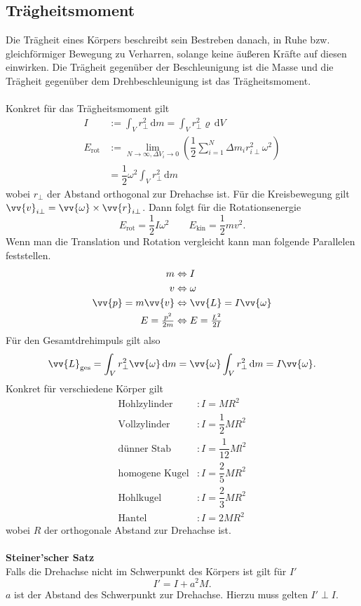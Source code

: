 \documentclass[a4paper,12pt]{article}
\newcommand{\td}{\,\text{d}}
\numberwithin{equation}{section}
\begin{document}
\subsection{Trägheitsmoment}
Die Trägheit eines Körpers beschreibt sein Bestreben danach, in Ruhe bzw. gleichförmiger Bewegung zu Verharren, solange keine äußeren Kräfte auf diesen einwirken. Die Trägheit gegenüber der Beschleunigung ist die Masse und die Trägheit gegenüber dem Drehbeschleunigung ist das Trägheitsmoment.\\\\
Konkret für das Trägheitsmoment gilt
\begin{align*}
        I&:=\int_{V}^{}r_{\perp}^2\td m=\int_{V}^{}r_{\perp}^2\varrho\td V\\
        E_{\text{rot}}&:=\lim_{N\rightarrow \infty,\Delta V_i\rightarrow 0}\left(\dfrac{1}{2}\sum_{i=1}^{N}\Delta m_ir_{i\perp}^2\omega ^2\right)\\
                      &=\dfrac{1}{2}\omega ^2\int_{V}^{}r_{\perp}^2\td m
\end{align*}
wobei $r_{\perp}$ der Abstand orthogonal zur Drehachse ist. Für die Kreisbewegung gilt $\vv{v}_{i\perp}=\vv{\omega }\times\vv{r}_{i\perp}$. Dann folgt für die Rotationsenergie
\[ 
        E_{\text{rot}}=\dfrac{1}{2}I\omega ^2\qquad E_{\text{kin}}=\dfrac{1}{2}mv^2
.\] 
Wenn man die Translation und Rotation vergleicht kann man folgende Parallelen feststellen.
\begin{align*}
        m&\Leftrightarrow I\\
        v&\Leftrightarrow \omega \\
        \vv{p}=m\vv{v}&\Leftrightarrow \vv{L}=I\vv{\omega }\\
        E=\tfrac{p^2}{2m}&\Leftrightarrow E=\tfrac{L^2}{2I}
\end{align*}
Für den Gesamtdrehimpuls gilt also
\[ 
        \vv{L}_{\text{ges}}=\int_{V}^{}r_{\perp}^2\vv{\omega }\td m=\vv{\omega }\int_{V}^{}r_{\perp}^2\td m=I\vv{\omega }
.\] 
Konkret für verschiedene Körper gilt
\begin{align*}
        \text{Hohlzylinder}&:I=MR^2\\
        \text{Vollzylinder}&:I=\dfrac{1}{2}MR^2\\
        \text{dünner Stab}&:I=\dfrac{1}{12}Ml ^2\\
        \text{homogene Kugel}&:I=\dfrac{2}{5}MR^2\\
        \text{Hohlkugel}&:I=\dfrac{2}{3}MR^2\\
        \text{Hantel}&:I=2MR^2
\end{align*}
wobei $R$ der orthogonale Abstand zur Drehachse ist.
\\\hfill\\\textbf{Steiner'scher Satz}\\ 
Falls die Drehachse nicht im Schwerpunkt des Körpers ist gilt für $I'$ 
\[ 
        I'=I+a^2M
.\] 
$a$ ist der Abstand des Schwerpunkt zur Drehachse. Hierzu muss gelten $I'\perp I$.
\end{document}
